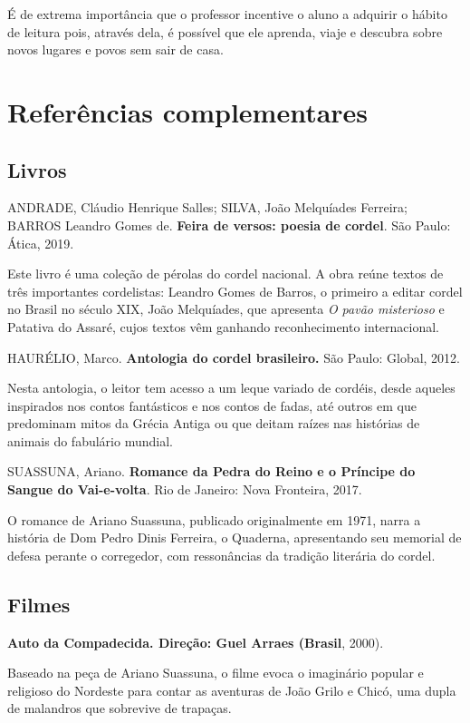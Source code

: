 \documentclass[12pt]{extarticle}
\begin{document}
É de extrema importância que o professor incentive o aluno a adquirir o
hábito de leitura pois, através dela, é possível que ele aprenda, viaje
e descubra sobre novos lugares e povos sem sair de casa.

\section{Referências complementares}


\subsection{Livros}

  ANDRADE, Cláudio Henrique Salles; SILVA, João Melquíades Ferreira;
  BARROS Leandro Gomes de. \textbf{Feira de versos: poesia de cordel}.
  São Paulo: Ática, 2019.

Este livro é uma coleção de pérolas do cordel nacional. A obra reúne
textos de três importantes cordelistas: Leandro Gomes de Barros, o
primeiro a editar cordel no Brasil no século XIX, João Melquíades, que
apresenta \emph{O pavão misterioso} e Patativa do Assaré, cujos textos
vêm ganhando reconhecimento internacional.


  HAURÉLIO, Marco. \textbf{Antologia do cordel brasileiro.} São Paulo:
  Global, 2012.

Nesta antologia, o leitor tem acesso a um leque variado de cordéis,
desde aqueles inspirados nos contos fantásticos e nos contos de fadas,
até outros em que predominam mitos da Grécia Antiga ou que deitam raízes
nas histórias de animais do fabulário mundial.


  SUASSUNA, Ariano. \textbf{Romance da Pedra do Reino e o Príncipe do
  Sangue do Vai-e-volta}. Rio de Janeiro: Nova Fronteira, 2017.

O romance de Ariano Suassuna, publicado originalmente em 1971, narra a
história de Dom Pedro Dinis Ferreira, o Quaderna, apresentando seu
memorial de defesa perante o corregedor, com ressonâncias da tradição
literária do cordel.


\subsection{Filmes}

  \textbf{Auto da Compadecida. Direção: Guel Arraes (Brasil}, 2000).

Baseado na peça de Ariano Suassuna, o filme evoca o imaginário popular e
religioso do Nordeste para contar as aventuras de João Grilo e Chicó,
uma dupla de malandros que sobrevive de trapaças.
\end{document}
